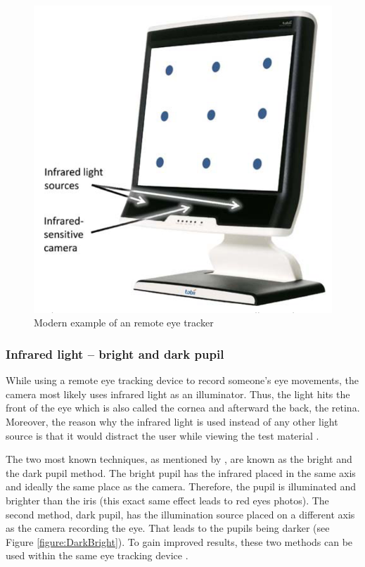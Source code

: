 \begin{figure}[!ht]
    \centering
    \includegraphics[width=0.75\linewidth]{images/remote_biedert2010eyebook.png}
    \caption{
        Modern example of an remote eye tracker \autocite[274]{biedert2010eyebook}
    }
    \label{figure:Remote}
\end{figure}

\subsubsection{Infrared light -- bright and dark pupil}
While using a remote eye tracking device to record someone's eye movements, the camera most likely uses infrared light as an illuminator. Thus, the light hits the front of the eye which is also called the cornea and afterward the back, the retina. 
Moreover, the reason why the infrared light is used instead of any other light source is that it would distract the user while viewing the test material \autocite[]{poole2006eye, biedert2010eyebook}.

The two most known techniques, as mentioned by \textcite[]{goldberg2002eye}, are known as the bright and the dark pupil method. The bright pupil has the infrared placed in the same axis and ideally the same place as the camera. Therefore, the pupil is illuminated and brighter than the iris (this exact same effect leads to red eyes photos). The second method, dark pupil, has the illumination source placed on a different axis as the camera recording the eye. That leads to the pupils being darker (see Figure \ref{figure:DarkBright}). To gain improved results, these two methods can be used within the same eye tracking device \autocite[]{tobii2018dark, goldberg2002eye}. 


